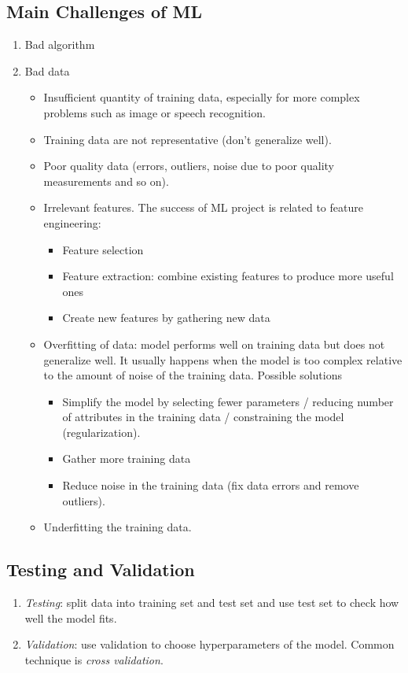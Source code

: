 \documentclass[12pt,oneside,a4paper]{article}
\numberwithin{equation}{section}
\begin{document}
\subsection{Main Challenges of ML}
\begin{enumerate}
\item Bad algorithm

\item Bad data 
\begin{itemize}
\item Insufficient quantity of training data, especially for more complex problems such as image or speech recognition.
\item Training data are not representative (don't generalize well).
\item Poor quality data (errors, outliers, noise due to poor quality measurements and so on).
\item Irrelevant features. The success of ML project is related to feature engineering: 
\begin{itemize}
\item Feature selection 
\item Feature extraction: combine existing features to produce more useful ones 
\item Create new features by gathering new data
\end{itemize}
\item Overfitting of data: model performs well on training data but does not generalize well. It usually happens when the model is too complex relative to the amount of noise of the training data. Possible solutions 
\begin{itemize}
\item Simplify the model by selecting fewer parameters / reducing number of attributes in the training data / constraining the model (regularization).
\item Gather more training data 
\item Reduce noise in the training data (fix data errors and remove outliers).
\end{itemize}
\item Underfitting the training data.
\end{itemize}
\end{enumerate}
\subsection{Testing and Validation}
\begin{enumerate}
\item \emph{Testing}: split data into training set and test set and use test set to check how well the model fits. 

\item \emph{Validation}: use validation to choose hyperparameters of the model. Common technique is \emph{cross validation}.
\end{enumerate}
\end{document}
